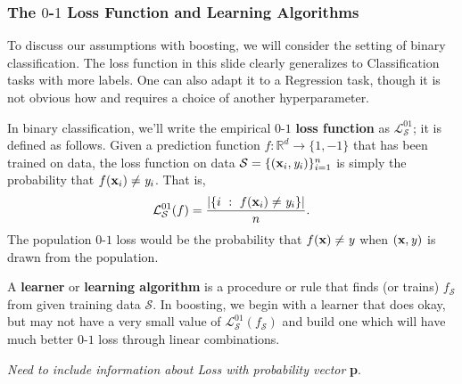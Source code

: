 \documentclass[smaller]{beamer}
\theoremstyle{example}
\newcommand{\x}{\textbf{x}}
\newcommand{\ix}[1]{{\it #1}}
\begin{document}
\begin{frame}
    \frametitle{The $0$-$1$ Loss Function and Learning Algorithms}
    To discuss our assumptions with boosting, we will consider the setting of binary classification. The loss function in this slide clearly generalizes to Classification tasks with more labels. One can also adapt it to a Regression task, though it is not obvious how and requires a choice of another hyperparameter. 
    
    In binary classification, we'll write the empirical $0$-$1$ \textbf{loss function} as $\mathcal L_{\mathcal S}^{01}$; it is defined as follows. Given a prediction function $f:\mathbb R^d\to\{1, -1\}$ that has been trained on data, the loss function on data $\mathcal S = \{(\x_i,\ix y_i)\}_{i=1}^n$ is simply the probability that $f(\x_i) \ne \ix y_i$. That is, 
        \[\mathcal L_{\mathcal S}^{01}(f) = \frac{|\{i\ :\ f(\x_i) \ne \ix y_i\}|}{n}.\]
    The population $0$-$1$ loss would be the probability that $f(\x) \ne \ix y$ when $(\x,\ix y)$ is drawn from the population.

    A \textbf{learner} or \textbf{learning algorithm} is a procedure or rule that finds (or trains) $f_{\mathcal S}$ from given training data $\mathcal S$. In boosting, we begin with a learner that does okay, but may not have a very small value of $\mathcal L_{\mathcal S}^{01}(f_{\mathcal S})$ and build one which will have much better $0$-$1$ loss through linear combinations.

    \textit{Need to include information about Loss with probability vector }\textbf{p}.
\end{frame}
\end{document}
